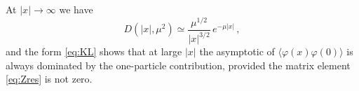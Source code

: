 At $|x|\to\infty$ we have
\[
D(|x|,\mu^2)\simeq\frac{\mu^{1/2}}{|x|^{3/2}}\,e^{-\mu|x|}\,,
\]
and the form \eqref{eq:KL} shows that at large $|x|$ the asymptotic of
$\langle\varphi(x)\varphi(0)\rangle$ is always dominated by the one-particle
contribution, provided the matrix element \eqref{eq:Zres} is not zero.
